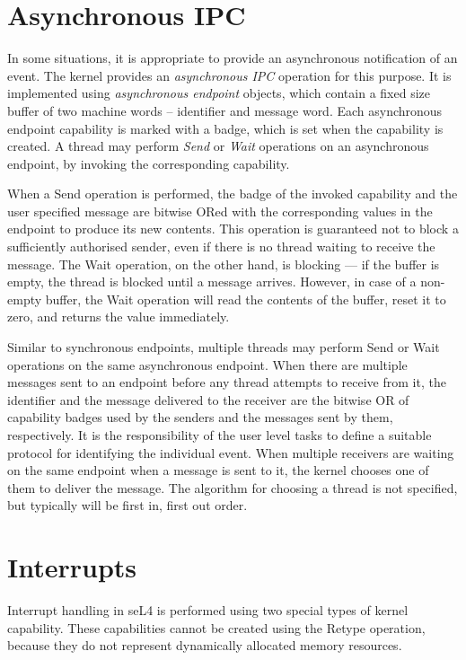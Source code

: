 \section{Asynchronous IPC}\label{sec:overview.async-ipc}

In some situations, it is appropriate to provide an asynchronous notification
of an event. The kernel provides an \emph{asynchronous IPC} operation for this
purpose. It is implemented using \emph{asynchronous endpoint} objects, which
contain a fixed size buffer of two machine words -- identifier and message word. 
Each asynchronous endpoint capability is marked with a badge, which is set when
the capability is created. A thread may perform \emph{Send} or \emph{Wait}
operations on an asynchronous endpoint, by invoking the corresponding
capability. 

When a Send operation is performed, the badge of the invoked capability and the
user specified message are bitwise ORed with the corresponding values in the
endpoint to produce its new contents. This operation is guaranteed not to block
a sufficiently authorised sender, even if there is no thread waiting to receive
the message. The Wait operation, on the other hand, is blocking --- if the
buffer is empty, the thread is blocked until a message arrives. However, in
case of a non-empty buffer, the Wait operation will read the contents of the
buffer, reset it to zero, and returns the value immediately. 

Similar to synchronous endpoints, multiple threads may perform Send or Wait
operations on the same asynchronous endpoint. When there are multiple messages
sent to an endpoint before any thread attempts to receive from it, the
identifier and the message delivered to the receiver are the bitwise OR of
capability badges used by the senders and the messages sent by them,
respectively. It is the responsibility of the user level tasks to define a
suitable protocol for identifying the individual event. When multiple receivers
are waiting on the same endpoint when a message is sent to it, the kernel
chooses one of them to deliver the message. The algorithm for choosing a thread
is not specified, but typically will be first in, first out order.

\section{Interrupts}\label{sec:overview.interrupts}

Interrupt handling in seL4 is performed using two special types of kernel 
capability. These capabilities cannot be created using the Retype operation,
because they do not represent dynamically allocated memory resources.

